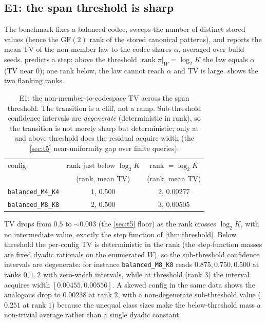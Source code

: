 \documentclass[sigconf,nonacm,anonymous,balance=false]{acmart}
\newcommand{\GF}{\mathrm{GF}(2)}
\DeclareMathOperator{\rank}{rank}
\newcommand{\W}{W}                          %
\newcommand{\proj}{\pi}                     %
\newcommand{\al}{\alpha}                    %
\begin{document}
\subsection{E1: the span threshold is sharp}

The benchmark fixes a balanced codec, sweeps the number of distinct stored values (hence
the $\GF$ rank of the stored canonical patterns), and reports the mean TV of the
non-member law to the codec shares $\al$, averaged over build seeds. 
predicts a step: above the threshold $\rank \proj|_{\W} = \log_2 K$ the law equals $\al$
(TV near $0$); one rank below, the law cannot reach $\al$ and TV is large.
 shows the two flanking ranks.

\begin{table}[t]
  \centering
  \caption{E1: the non-member-to-codespace TV across the span threshold. The transition
  is a cliff, not a ramp. Sub-threshold confidence intervals are \emph{degenerate}
  (deterministic in rank), so the transition is not merely sharp but deterministic; only
  at and above threshold does the residual acquire width (the \cref{sec:t5} near-uniformity
  gap over finite queries).}
  \label{tab:e1}
  \begin{tabular}{lcc}
    \toprule
    config & rank just below $\log_2 K$ & rank $= \log_2 K$ \\
           & (rank, mean TV) & (rank, mean TV) \\
    \midrule
    \texttt{balanced\_M4\_K4} & $1$, \quad $0.500$ & $2$, \quad $0.00277$ \\
    \texttt{balanced\_M8\_K8} & $2$, \quad $0.500$ & $3$, \quad $0.00505$ \\
    \bottomrule
  \end{tabular}
\end{table}

TV drops from $0.5$ to $\sim 0.003$ (the \cref{sec:t5} floor) as the rank crosses
$\log_2 K$, with no intermediate value, exactly the step function of \cref{thm:threshold}.
Below threshold the per-config TV is deterministic in the rank (the step-function masses
are fixed dyadic rationals on the enumerated $\W$), so the sub-threshold confidence
intervals are degenerate: for instance \texttt{balanced\_M8\_K8} reads $0.875, 0.750,
0.500$ at ranks $0, 1, 2$ with zero-width intervals, while at threshold (rank $3$) the
interval acquires width $[0.00455, 0.00556]$. A skewed config in the same data shows the
analogous drop to $0.00238$ at rank $2$, with a non-degenerate sub-threshold value
($0.251$ at rank $1$) because the unequal class sizes make the below-threshold mass a
non-trivial average rather than a single dyadic constant.
\end{document}
